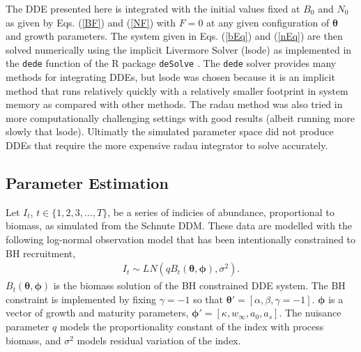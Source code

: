 %
The DDE presented here is integrated with the initial values fixed at $B_0$
and $N_0$ as given by Eqs. (\ref{BF}) and (\ref{NF}) with $F=0$ at any given
configuration of $\bm{\theta}$ and growth parameters. %
The system given in Eqs. (\ref{bEq}) and (\ref{nEq}) are then solved
numerically using the implicit Livermore Solver (lsode) as implemented in the
\verb|dede| function of the R package \verb|deSolve| \cite{soetaert_solving_2010}.
The \verb|dede| solver provides many methods for integrating DDEs, but lsode
was chosen because it is an implicit method that runs relatively quickly with
a relatively smaller footprint in system memory as compared with other methods.
The radau method was also tried in more computationally challenging settings
with good results (albeit running more slowly that lsode). Ultimatly the
simulated parameter space did not produce DDEs that require the more expensive
radau integrator to solve accurately.

%

%
\subsection{Parameter Estimation}

%
Let $I_t$, $t\in\{1,2,3,...,T\}$, be a series of indicies of abundance, 
proportional to biomass, as simulated from the Schnute DDM. These data 
are modelled with the following log-normal observation model that has been 
intentionally constrained to BH recruitment, 
%
\begin{align}
I_t \sim LN(q B_t(\bm{\theta}, \bm{\phi}), \sigma^2). \label{bL}
\end{align}
%
$B_t(\bm{\theta}, \bm{\phi})$ is the biomass solution of the BH constrained DDE system. %
The BH constraint is implemented by fixing $\gamma=-1$ so that $\bm{\theta}'=[\alpha, \beta, \gamma=-1]$. 
$\bm{\phi}$ is a vector of growth and maturity parameters, 
$\bm{\phi}'=[\kappa, w_\infty, a_0, a_s]$. The nuisance parameter $q$ models 
the proportionality constant of the index with process biomass, and $\sigma^2$ 
models residual variation of the index.


